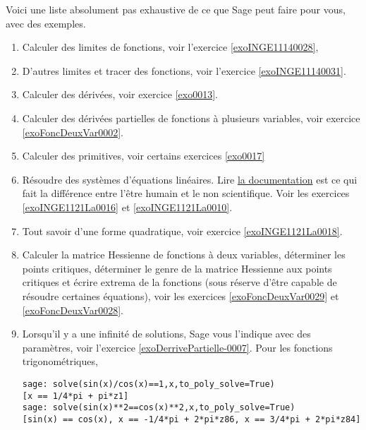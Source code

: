Voici une liste absolument pas exhaustive de ce que Sage peut faire pour vous, avec des exemples. 
\begin{enumerate}

	\item
		Calculer des limites de fonctions, voir l'exercice \ref{exoINGE11140028},

	\item
		D'autres limites et tracer des fonctions, voir l'exercice \ref{exoINGE11140031}.
	\item
		Calculer des dérivées, voir exercice \ref{exo0013}.
	\item
		Calculer des dérivées partielles de fonctions à plusieurs variables, voir exercice \ref{exoFoncDeuxVar0002}.
	\item
		Calculer des primitives, voir certains exercices \ref{exo0017}
	\item

		Résoudre des systèmes d'équations linéaires. Lire \href{http://www.sagemath.org/doc/constructions/linear_algebra.html#solving-systems-of-linear-equations}{la documentation} est ce qui fait la différence entre l'être humain et le non scientifique. Voir les exercices  \ref{exoINGE1121La0016} et \ref{exoINGE1121La0010}.

	\item
		Tout savoir d'une forme quadratique, voir exercice \ref{exoINGE1121La0018}.
	\item
		Calculer la matrice Hessienne de fonctions à deux variables, déterminer les points critiques, déterminer le genre de la matrice Hessienne aux points critiques et écrire extrema de la fonctions (sous réserve d'être capable de résoudre certaines équations), voir les exercices \ref{exoFoncDeuxVar0029} et \ref{exoFoncDeuxVar0028}.
	\item
		Lorsqu'il y a une infinité de solutions, Sage vous l'indique avec des paramètres, voir l'exercice \ref{exoDerrivePartielle-0007}. Pour les fonctions trigonométriques, 
        \begin{verbatim}
sage: solve(sin(x)/cos(x)==1,x,to_poly_solve=True)                                                         
[x == 1/4*pi + pi*z1]
sage: solve(sin(x)**2==cos(x)**2,x,to_poly_solve=True)
[sin(x) == cos(x), x == -1/4*pi + 2*pi*z86, x == 3/4*pi + 2*pi*z84]
        \end{verbatim}


\end{enumerate}
